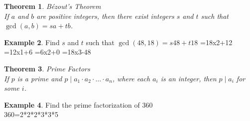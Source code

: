 \documentclass[letterpaper,10pt]{article}
\theoremstyle{plain}
\newtheorem{thm}{Theorem}[section]
\theoremstyle{definition}
\newtheorem{exmp}[thm]{Example}
\theoremstyle{remark}
\begin{document}
\begin{thm}{Bézout's Theorem}$ $\\
If $a$ and $b$ are positive integers, then there exist integers $s$ and $t$ such that $\gcd(a, b) = sa + tb$.
\end{thm}
\begin{exmp}
Find $s$ and $t$ such that $\gcd(48,18)= s48 + t18$
\vspace{2cm}
=18x2+12
=12x1+6
=6x2+0
=18x3-48
\end{exmp}

\begin{thm}{Prime Factors}$ $\\
If $p$ is a prime and $p \mid a_1 \cdot a_2 \cdot \ldots \cdot a_n$, where each $a_i$ is an integer, then $p \mid a_i$ for some $i$.
\end{thm}
\begin{exmp}{Find the prime factorization of 360}
\vspace{2cm} $ $\\
360=2*2*2*3*3*5
\end{exmp}
\end{document}
